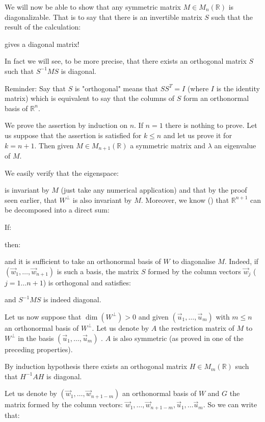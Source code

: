 	\begin{theorem}
		We will now be able to show that any symmetric matrix $M \in M_n(\mathbb{R})$ is diagonalizable. That is to say that there is an invertible matrix $S$ such that the result of the calculation:
	
	gives a diagonal matrix!
	\begin{tcolorbox}[title=Remark,colframe=black,arc=10pt]
	In fact we will see, to be more precise, that there exists an orthogonal matrix $S$ such that $S^{-1}MS$ is diagonal.
	\end{tcolorbox}
	Reminder: Say that $S$ is "orthogonal" means that $SS^T=I$ (where $I$ is the identity matrix) which is equivalent to say that the columns of $S$ form an orthonormal basis of $\mathbb{R}^n$.
	\end{theorem}
	\begin{dem}
	We prove the assertion by induction on $n$. If $n=1$ there is nothing to prove. Let us suppose that the assertion is satisfied for $k\leq n$ and let us prove it for $k=n+1$. Then given $M\in M_{n+1}(\mathbb{R})$ a symmetric matrix and $\lambda$ an eigenvalue of $M$.
	
	We easily verify that the eigenspace:
	
	is invariant by $M$ (just take any numerical application) and that by the proof seen earlier, that $W^\perp$ is also invariant by $M$. Moreover, we know () that $\mathbb{R}^{n+1}$ can be decomposed into a direct sum:
	
	If:
	
	then:
	
	and it is sufficient to take an orthonormal basis of $W$ to diagonalise $M$. Indeed, if $(\vec{w}_1,\ldots,\vec{w}_{n+1})$ is such a basis, the matrix $S$ formed by the column vectors $\vec{w}_j$ ($j=1\ldots n+1$) is orthogonal and satisfies:
	
	and $S^{-1}MS$ is indeed diagonal.
	
	Let us now suppose that $\dim(W^\perp)>0$ and given $(\vec{u}_1,\ldots,\vec{u}_m)$ with $m\leq n$ an orthonormal basis of $W^\perp$. Let us denote by $A$ the restriction matrix of $M$ to $W^\perp$ in the basis  $(\vec{u}_1,\ldots,\vec{u}_m)$ . $A$ is also  symmetric (as proved in one of the preceding properties).
	
	By induction hypothesis there exists an orthogonal matrix $H\in M_m(\mathbb{R})$ such that $H^{-1}AH$ is diagonal.
	
	Let us denote by $(\vec{w}_1,\ldots,\vec{w}_{n+1-m})$ an orthonormal basis of $W$ and $G$ the matrix formed by the column vectors: $\vec{w}_1,\ldots,\vec{w}_{n+1-m},\vec{u}_1,\ldots\vec{u}_m$. So we can write that:
	

\end{dem}
